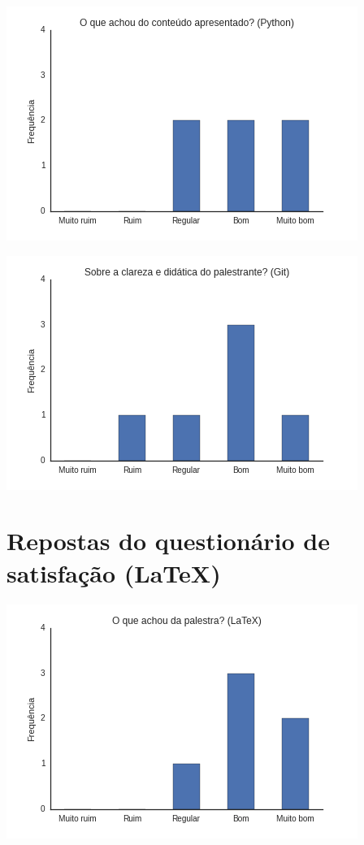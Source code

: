 \documentclass[12pt]{article}
\begin{document}
\begin{center}
    \includegraphics[height=0.25\textheight]{images/python2.png}
\end{center}

\begin{center}
    \includegraphics[height=0.25\textheight]{images/python3.png}
\end{center}

\section*{Repostas do questionário de satisfação (LaTeX)}

\begin{center}
    \includegraphics[height=0.25\textheight]{images/latex1.png}
\end{center}
\end{document}
